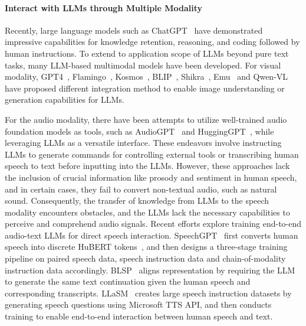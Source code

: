 \documentclass{article}
\begin{document}
\paragraph{Interact with LLMs through Multiple Modality}
Recently, large language models such as ChatGPT~\citep{chatgpt} have demonstrated impressive capabilities for knowledge retention, reasoning, and coding followed by human instructions. To extend to application scope of LLMs beyond pure text tasks, many LLM-based multimodal models have been developed. For visual modality, GPT4~\citep{gpt4}, Flamingo~\citep{alayrac2022flamingo}, Kosmos~\citep{kosmos2}, BLIP~\citep{blip}, Shikra~\citep{shikra}, Emu~\citep{EMU} and Qwen-VL~\citep{qwenvl} have proposed different integration method to enable image understanding or generation capabilities for LLMs.

For the audio modality, there have been attempts to utilize well-trained audio foundation models as tools, such as AudioGPT~\citep{AudioGPT} and HuggingGPT~\citep{HuggingGPT}, while leveraging LLMs as a versatile interface. These endeavors involve instructing LLMs to generate commands for controlling external tools or transcribing human speech to text before inputting into the LLMs. However, these approaches lack the inclusion of crucial information like prosody and sentiment in human speech, and in certain cases, they fail to convert non-textual audio, such as natural sound. Consequently, the transfer of knowledge from LLMs to the speech modality encounters obstacles, and the LLMs lack the necessary capabilities to perceive and comprehend audio signals. Recent efforts explore training end-to-end audio-text LLMs for direct speech interaction. SpeechGPT~\citep{speechgpt} first converts human speech into discrete HuBERT tokens~\citep{HuBERT}, and then designs a three-stage training pipeline on paired speech data, speech instruction data and chain-of-modality instruction data accordingly. BLSP~\citep{wang2023blsp} aligns representation by requiring the LLM to generate the same text continuation given the human speech and corresponding transcripts.
LLaSM~\citep{shu2023llasm} creates large speech instruction datasets by generating speech questions using Microsoft TTS API, and then conducts training to enable end-to-end interaction between human speech and text.
\end{document}
